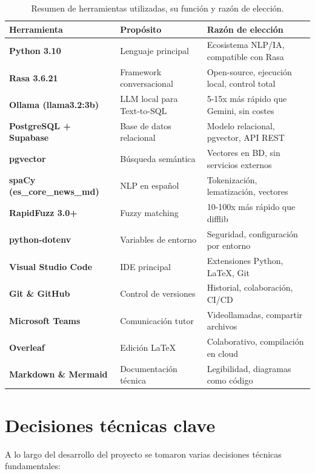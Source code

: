 \begin{table}[h]
\centering
\begin{tabular}{|l|p{4.5cm}|p{4cm}|}
\hline
\textbf{Herramienta} & \textbf{Propósito} & \textbf{Razón de elección} \\ \hline
\textbf{Python 3.10} & Lenguaje principal & Ecosistema NLP/IA, compatible con Rasa \\ \hline
\textbf{Rasa 3.6.21} & Framework conversacional & Open-source, ejecución local, control total \\ \hline
\textbf{Ollama (llama3.2:3b)} & LLM local para Text-to-SQL & 5-15x más rápido que Gemini, sin costes \\ \hline
\textbf{PostgreSQL + Supabase} & Base de datos relacional & Modelo relacional, pgvector, API REST \\ \hline
\textbf{pgvector} & Búsqueda semántica & Vectores en BD, sin servicios externos \\ \hline
\textbf{spaCy (es\_core\_news\_md)} & NLP en español & Tokenización, lematización, vectores \\ \hline
\textbf{RapidFuzz 3.0+} & Fuzzy matching & 10-100x más rápido que difflib \\ \hline
\textbf{python-dotenv} & Variables de entorno & Seguridad, configuración por entorno \\ \hline
\textbf{Visual Studio Code} & IDE principal & Extensiones Python, LaTeX, Git \\ \hline
\textbf{Git \& GitHub} & Control de versiones & Historial, colaboración, CI/CD \\ \hline
\textbf{Microsoft Teams} & Comunicación tutor & Videollamadas, compartir archivos \\ \hline
\textbf{Overleaf} & Edición LaTeX & Colaborativo, compilación en cloud \\ \hline
\textbf{Markdown \& Mermaid} & Documentación técnica & Legibilidad, diagramas como código \\ \hline
\end{tabular}
\caption{Resumen de herramientas utilizadas, su función y razón de elección.}
\label{tab:resumen-herramientas}
\end{table}

\section{Decisiones técnicas clave}

A lo largo del desarrollo del proyecto se tomaron varias decisiones técnicas fundamentales:

